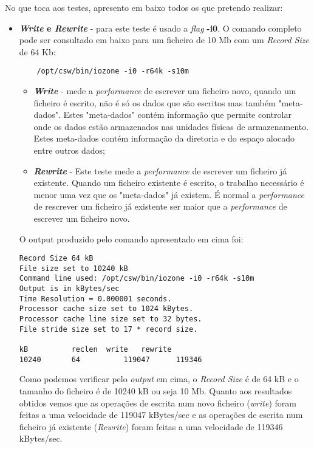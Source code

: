 \documentclass[conference,compsoc]{IEEEtran}
\begin{document}
No que toca aos testes, apresento em baixo todos os que pretendo realizar:
\begin{itemize}
	\item \textbf{\textit{Write} e \textit{Rewrite}} - para este teste é usado a \textit{flag} \textbf{-i0}. O comando completo pode ser consultado em baixo para um ficheiro de 10 Mb com um \textit{Record Size} de 64 Kb:
	
	\begin{lstlisting}
	/opt/csw/bin/iozone -i0 -r64k -s10m
	\end{lstlisting}
	
	\begin{itemize}
		\item \textbf{\textit{Write}} - mede a \textit{performance} de escrever um ficheiro novo, quando um ficheiro é escrito, não é só os dados que são escritos mas também "meta-dados". Estes "meta-dados" contém informação que permite controlar onde os dados estão armazenados nas unidades físicas de armazenamento. Estes meta-dados contém informação da diretoria e do espaço alocado entre outros dados;
		\item \textbf{\textit{Rewrite}} - Este teste mede a \textit{performance} de escrever um ficheiro já existente. Quando um ficheiro existente é escrito, o trabalho necessário é menor uma vez que os "meta-dados" já existem. É normal a \textit{performance} de rescrever um ficheiro já existente ser maior que a \textit{performance} de escrever um ficheiro novo.	
	\end{itemize}
	
	O output produzido pelo comando apresentado em cima foi:
	
\begin{lstlisting}
Record Size 64 kB
File size set to 10240 kB
Command line used: /opt/csw/bin/iozone -i0 -r64k -s10m
Output is in kBytes/sec
Time Resolution = 0.000001 seconds.
Processor cache size set to 1024 kBytes.
Processor cache line size set to 32 bytes.
File stride size set to 17 * record size.
                                  
kB  	  	reclen	write  	rewrite    
10240     	64   		119047   	119346
	\end{lstlisting}
	
	Como podemos verificar pelo \textit{output} em cima, o \textit{Record Size} é de 64 kB e o tamanho do ficheiro é de 10240 kB ou seja 10 Mb. Quanto aos resultados obtidos vemos que as operações de escrita num novo ficheiro (\textit{write}) foram feitas a uma velocidade de 119047 kBytes/sec e as operações de escrita num ficheiro já existente (\textit{Rewrite}) foram feitas a uma velocidade de 119346 kBytes/sec.
	

\end{itemize}
\end{document}
